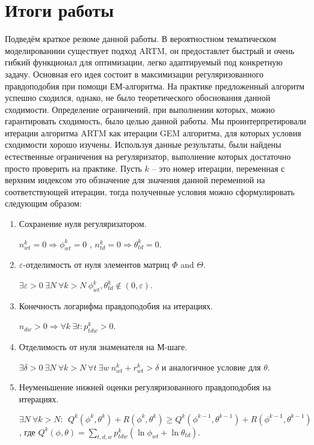 \documentclass[12pt]{article}
\renewcommand{\geq}{\geqslant}
\begin{document}
\section{Итоги работы}
	Подведём краткое резюме данной работы. В вероятностном тематическом моделированиии существует подход ARTM, он предоставлет быстрый и очень гибкий функционал для оптимизации, легко адаптируемый под конкретную задачу. Основная его идея состоит в максимизации регуляризованного правдоподобия при помощи ЕМ-алгоритма. На практике предложенный алгоритм успешно сходился, однако, не было теоретического обоснования данной сходимости. Определение ограничений, при выполнении которых, можно гарантировать сходимость, было целью данной работы. Мы проинтерпретировали итерации алгоритма ARTM как итерации GEM алгоритма, для которых условия сходимости хорошо изучены. Используя данные результаты, были найдены естественные ограничения на регуляризатор, выполнение которых достаточно просто проверить на практике. Пусть $k$ -- это номер итерации, переменная с  верхним индексом это обзначение для значения данной переменной на соответствующей итерации, тогда полученные условия можно сформулировать следующим образом:
\begin{enumerate}
\item Сохранение нуля регуляризатором.
\smallskip

$ n^k_{wt} = 0 \Rightarrow \phi^k_{wt} = 0$ , $n^k_{td} = 0 \Rightarrow \theta^k_{td} = 0$.
\item $\varepsilon$-отделимость от нуля элементов матриц $\Phi$ and $\Theta$.
\smallskip

$\exists \varepsilon>0\ \exists N\ \forall k > N\ \phi^k_{wt}, \theta^k_{td} \notin (0, \varepsilon)$. 
\item  Конечность логарифма правдоподобия на итерациях.
\smallskip

$ n_{dw}>0 \Rightarrow \forall k\ \exists t\colon p^k_{tdw} > 0$.
\item Отделимость от нуля знаменателя на М-шаге.
\smallskip

$\exists \delta >0\ \exists N\ \forall k > N \ \forall t\ \exists w\  n^k_{wt} + r^k_{wt} > \delta$ и аналогичное условие для $\theta$. 
\item Неуменьшение нижней оценки регуляризованного правдоподобия на итерациях.
\smallskip

$\exists N\ \forall k > N\colon\ \ Q^k (\phi^k, \theta^k)+ R(\phi^k, \theta^k) \geq Q^k(\phi^{k-1}, \theta^{k-1}) + R(\phi^{k-1}, \theta^{k-1})$, где $Q^k(\phi, \theta) = \sum\limits_{t,d,w} p^k_{tdw} (\ln \phi_{wt} + \ln \theta_{td})$.
\end{enumerate}
\end{document}
